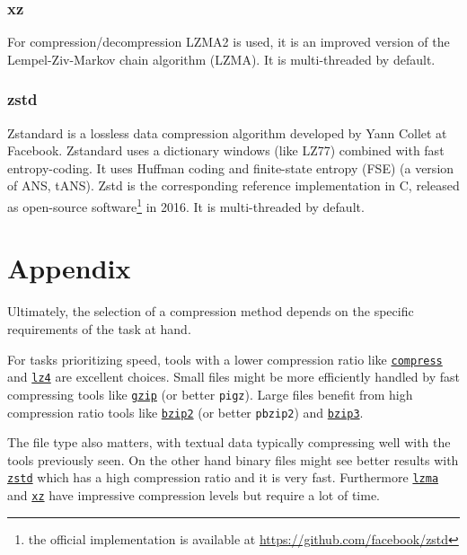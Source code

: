 \documentclass[12pt, a4paper]{report}
\begin{document}
\subsection{xz}
\label{subsec:xz}

For compression/decompression LZMA2 is used, it is an improved version of the Lempel-Ziv-Markov chain algorithm (LZMA).
It is multi-threaded by default.

\subsection{zstd}
\label{subsec:zstd}

Zstandard is a lossless data compression algorithm developed by Yann Collet at Facebook.
Zstandard uses a dictionary windows (like LZ77) combined with fast entropy-coding.
It uses Huffman coding and finite-state entropy (FSE) (a version of ANS, tANS).
Zstd is the corresponding reference implementation in C, released as open-source software\footnote{the official implementation is
available at \url{https://github.com/facebook/zstd}} in 2016.
It is multi-threaded by default.

\chapter*{Appendix}

Ultimately, the selection of a compression method depends on the specific requirements of the task at hand.

For tasks prioritizing speed, tools with a lower compression ratio like \hyperref[subsec:compress]{\texttt{compress}} and
\hyperref[subsec:lz4]{\texttt{lz4}} are excellent choices.
Small files might be more efficiently handled by fast compressing tools like \hyperref[subsec:gzip]{\texttt{gzip}} (or better
\texttt{pigz}).
Large files benefit from high compression ratio tools like \hyperref[subsec:bzip2]{\texttt{bzip2}} (or better \texttt{pbzip2})
and \hyperref[subsec:bzip3]{\texttt{bzip3}}.

The file type also matters, with textual data typically compressing well with the tools previously seen.
On the other hand binary files might see better results with \hyperref[subsec:zstd]{\texttt{zstd}} which has a high compression
ratio and it is very fast.
Furthermore \hyperref[subsec:lzma]{\texttt{lzma}} and \hyperref[subsec:xz]{\texttt{xz}} have impressive compression levels
but require a lot of time.

\printbibliography
\thispagestyle{empty}
\end{document}
